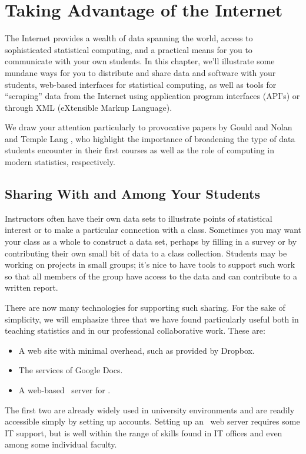 \chapter{Taking Advantage of the Internet}







The Internet provides a wealth of data spanning the world, access
to sophisticated statistical computing, and a practical means for
you to communicate with your own students.  In this chapter, we'll
illustrate some mundane ways for you to distribute and share data and
software with your students, web-based interfaces for statistical
computing,  as well as tools for ``scraping'' data
from the Internet using application program interfaces (API's) or
through XML (eXtensible Markup Language).   

We draw your attention particularly to 
provocative papers by Gould \cite{Goul:2010} and Nolan and Temple Lang
\cite{nola:temp:2010}, who
highlight the importance of broadening the type of data students encounter
in their first courses as well as the role of computing in modern statistics, respectively.

\section{Sharing With and Among Your Students}
\label{sec:distributing-data}

Instructors often have their own data sets to illustrate 
points of statistical interest or to make a particular connection with
a class.  Sometimes you may want your class as a whole to construct a
data set, perhaps by filling in a survey or by contributing
their own small bit of data to a class collection.  Students may be
working on projects in small groups; it's nice to have tools to
support such work so that all members of the group have access to the
data and can contribute to a written report.

There are now many technologies for supporting such sharing.  For the
sake of simplicity, we will emphasize three that we have found
particularly useful both in teaching statistics and in our
professional collaborative work.  These are:
\begin{itemize}
\item A web site with minimal overhead, such as provided by Dropbox.
\item The services of Google Docs.
\item A web-based \RStudio\ server for \R.
\end{itemize}
The first two are already widely used in university environments and
are readily accessible simply by setting up accounts.  Setting up an
\RStudio\ web server requires some IT support, but is well within the
range of skills found in IT offices and even among some individual faculty.

